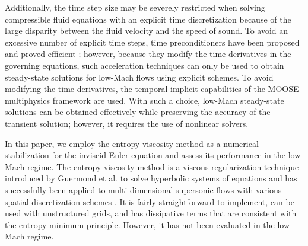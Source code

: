 \documentclass[review,10pt]{elsarticle}
\begin{document}
Additionally, the time step size may be severely restricted when solving compressible fluid equations with an explicit time discretization 
because of the large disparity between the fluid velocity and the speed of sound. 
To avoid an excessive number of explicit time steps, time preconditioners have been proposed and proved efficient \cite{LowMach2};
however, because they modify the time derivatives in the governing equations, such acceleration techniques can only be used to obtain
steady-state solutions for low-Mach flows using explicit schemes.
To avoid modifying the time derivatives, 
the temporal implicit capabilities of the MOOSE multiphysics framework \cite{MOOSE} are used. With such a choice, low-Mach steady-state solutions 
can be obtained effectively while preserving the accuracy of the transient solution; however, it requires the use of nonlinear solvers.

In this paper, we employ the entropy viscosity method as a numerical stabilization for the inviscid Euler equation and assess its performance 
in the low-Mach regime. 
The entropy viscosity method is a viscous regularization technique introduced by Guermond et al. to solve hyperbolic systems of equations
and has successfully been applied to multi-dimensional supersonic flows with various spatial discretization schemes \cite{jlg}. 
It is fairly straightforward to implement, can be used with unstructured grids, and has dissipative terms that are consistent with the 
entropy minimum principle. However, it has not been evaluated in the low-Mach regime.
\end{document}
